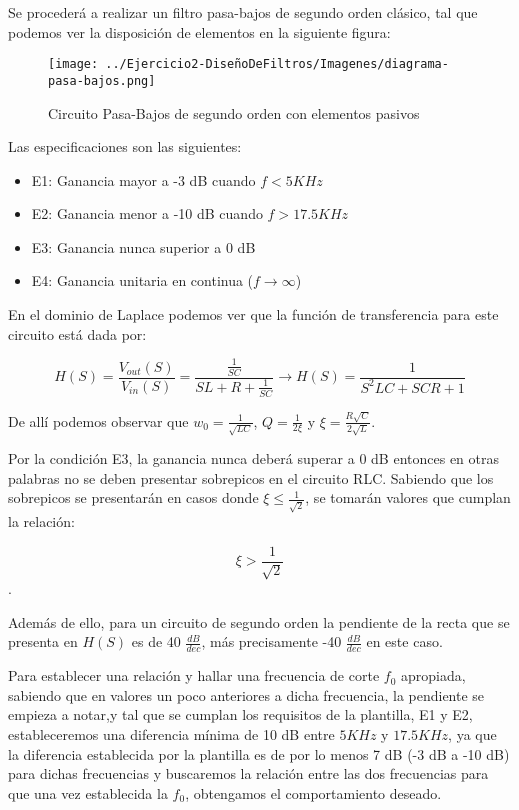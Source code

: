 Se procederá a realizar un filtro pasa-bajos de segundo orden clásico, tal que podemos
ver la disposición de elementos en la siguiente figura:

\begin{figure}[H]
    \centering
    \texttt{[image: ../Ejercicio2-DiseñoDeFiltros/Imagenes/diagrama-pasa-bajos.png]}
    \caption{Circuito Pasa-Bajos de segundo orden con elementos pasivos}
\end{figure}

Las especificaciones son las siguientes:

\begin{itemize}
	\item E1: Ganancia mayor a -3 dB cuando $f < 5 KHz$ 
	\item E2: Ganancia menor a -10 dB cuando $f > 17.5 KHz $
	\item E3: Ganancia nunca superior a 0 dB
	\item E4: Ganancia unitaria en continua ($f \to \infty$)
\end{itemize}

En el dominio de Laplace podemos ver que la función de transferencia para este circuito está dada por:

$$H(S)=\frac{V_{out}(S)}{V_{in}(S)}=\frac{\frac{1}{SC}}{SL+R+\frac{1}{SC}} \longrightarrow 
H(S)=\frac{1}{S^2LC+SCR+1}$$

De allí podemos observar que $w_0=\frac{1}{\sqrt{LC}}$, $Q=\frac{1}{2\xi}$ y $\xi=\frac{R\sqrt{C}}{2\sqrt{L}}$.

Por la condición E3, la ganancia nunca deberá superar a 0 dB entonces en otras palabras no se deben presentar sobrepicos en el circuito RLC.
Sabiendo que los sobrepicos se presentarán en casos donde $\xi \leq \frac{1}{\sqrt{2}}$, se tomarán valores que cumplan la relación:

$$\xi > \frac{1}{\sqrt{2}}$$.

Además de ello, para un circuito de segundo orden la pendiente de la recta que se presenta en $H(S)$ es de 
40 $\frac{dB}{dec}$, más precisamente -40 $\frac{dB}{dec}$ en este caso. 

Para establecer una relación y hallar una frecuencia de corte $f_0$ apropiada, 
sabiendo que en valores un poco anteriores a dicha frecuencia, la pendiente se empieza a notar,y tal que se cumplan los requisitos
de la plantilla, E1 y E2, estableceremos una diferencia mínima de 10 dB entre $5 KHz$ y $17.5 KHz$, ya que la diferencia establecida por la plantilla
es de por lo menos 7 dB (-3 dB a -10 dB) para dichas frecuencias y buscaremos la relación entre las dos frecuencias para que una vez establecida la $f_0$,
obtengamos el comportamiento deseado.

